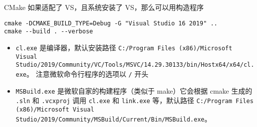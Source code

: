 
CMake 如果适配了 VS，且系统安装了 VS，那么可以用构造程序
\begin{lstlisting}[language=none]
cmake -DCMAKE_BUILD_TYPE=Debug -G "Visual Studio 16 2019" ..
cmake --build . --verbose
\end{lstlisting}

\begin{itemize}
\item \verb`cl.exe` 是编译器，默认安装路径 \verb`C:/Program Files (x86)/Microsoft Visual Studio/2019/Community/VC/Tools/MSVC/14.29.30133/bin/Hostx64/x64/cl.exe`。 注意微软命令行程序的选项以 \verb`/` 开头
\item \verb`MSBuild.exe` 是微软自家的构建程序（类似于 make）它会根据 cmake 生成的 \verb`.sln` 和 \verb`.vcxproj` 调用 \verb`cl.exe` 和 \verb`link.exe` 等，默认路径 \verb`C:/Program Files (x86)/Microsoft Visual Studio/2019/Community/MSBuild/Current/Bin/MSBuild.exe`。
\end{itemize}

